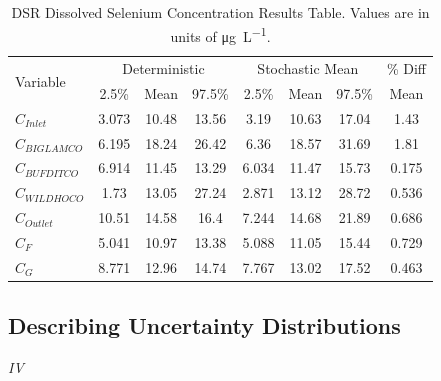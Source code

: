 \begin{linenumbers}
\begin{table}[htbp]
  \centering
  \caption[DSR Dissolved Selenium Concentration Results Table.]{DSR Dissolved Selenium Concentration Results Table.  Values are in units of \si{\micro\gram\per\liter}.}
  \label{tab:DSRConcResults}
    \begin{tabular}{l|ccc|ccc|c}
    \toprule
    \multirow{2}[0]{*}{Variable} & \multicolumn{3}{c}{Deterministic} & \multicolumn{3}{c}{Stochastic Mean} & \% Diff\\\cline{2-4} \cline{5-7}
    & 2.5\% & Mean & 97.5\% & 2.5\% & Mean & 97.5\% & Mean\\
    \midrule
    \midrule
	$C_{Inlet}$&	3.073	&10.48	&13.56	&3.19	&10.63	&17.04	&1.43	\\
	$C_{BIGLAMCO}$&	6.195	&18.24	&26.42	&6.36	&18.57	&31.69	&1.81	\\
	$C_{BUFDITCO}$&	6.914	&11.45	&13.29	&6.034	&11.47	&15.73	&0.175	\\
	$C_{WILDHOCO}$&	1.73	&13.05	&27.24	&2.871	&13.12	&28.72	&0.536	\\
	$C_{Outlet}$&	10.51	&14.58	&16.4	&7.244	&14.68	&21.89	&0.686	\\
	$C_{F}$&	5.041	&10.97	&13.38	&5.088	&11.05	&15.44	&0.729	\\
	$C_{G}$&	8.771	&12.96	&14.74	&7.767	&13.02	&17.52	&0.463	\\
    \bottomrule
    \end{tabular}
\end{table}
\clearpage

\clearpage{}
\subsection{Describing Uncertainty Distributions}
\emph{IV}\\


\end{linenumbers}
